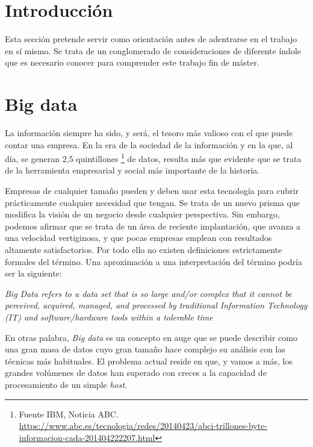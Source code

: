 
\section{Introducción}\label{teorico-introduccion}
Esta sección pretende servir como orientación antes de adentrarse en el trabajo en sí mismo. Se trata de un conglomerado de consideraciones de diferente índole que es necesario conocer para comprender este trabajo fin de máster. 

\section{Big data}\label{teorico-big-data}
La información siempre ha sido, y será, el tesoro más valioso con el que puede contar una empresa. En la era de la sociedad de la información y en la que, al día, se generan 2,5 quintillones \footnote{Fuente IBM, Noticia ABC. \url{https://www.abc.es/tecnologia/redes/20140423/abci-trillones-byte-informacion-cada-201404222207.html}} de datos, resulta más que evidente que se trata de la herramienta empresarial y social más importante de la historia. 

Empresas de cualquier tamaño pueden y deben usar esta tecnología para cubrir prácticamente cualquier necesidad que tengan. Se trata de un nuevo prisma que modifica la visión de un negocio desde cualquier perspectiva. Sin embargo, podemos afirmar  que se trata de un área de reciente implantación, que avanza a una velocidad vertiginosa, y que pocas empresas emplean con resultados altamente satisfactorios. Por todo ello no existen definiciones estrictamente formales del término. Una aproximación a una interpretación del término podría ser la siguiente:

\begin{displayquote}
	\emph{Big Data refers to a data set that is so large and/or complex that it cannot be perceived, acquired, managed, and processed by traditional Information Technology (IT) and software/hardware tools within a tolerable time} \cite{laval_introduction}
\end{displayquote} 

En otras palabra, \emph{Big data} es un concepto en auge que se puede describir como una gran masa de datos cuyo gran tamaño hace complejo su análisis con las técnicas más habituales. El problema actual reside en que, y vamos a más, los grandes volúmenes de datos han superado con creces a la capacidad de procesamiento de un simple \textit{host}. 

